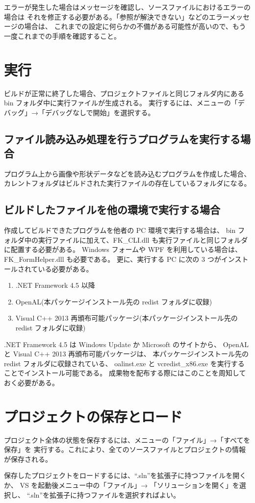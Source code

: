 \documentclass[a4j]{jarticle}
\begin{document}
エラーが発生した場合はメッセージを確認し、ソースファイルにおけるエラーの場合は
それを修正する必要がある。「参照が解決できない」などのエラーメッセージの場合は、
これまでの設定に何らかの不備がある可能性が高いので、もう一度これまでの手順を確認すること。


\section{実行}
ビルドが正常に終了した場合、プロジェクトファイルと同じフォルダ内にある 
bin フォルダ中に実行ファイルが生成される。
実行するには、メニューの「デバッグ」→「デバッグなしで開始」を選択する。

\subsection{ファイル読み込み処理を行うプログラムを実行する場合}
プログラム上から画像や形状データなどを読み込むプログラムを作成した場合、
カレントフォルダはビルドされた実行ファイルの存在しているフォルダになる。

\subsection{ビルドしたファイルを他の環境で実行する場合}
作成してビルドできたプログラムを他者の PC 環境で実行する場合は、
bin フォルダ中の実行ファイルに加えて、FK\_CLI.dll も実行ファイルと同じフォルダに配置する必要がある。
Windows フォームや WPF を利用している場合は、FK\_FormHelper.dll も必要である。
更に、実行する PC に次の 3 つがインストールされている必要がある。

\begin{enumerate}
\item .NET Framework 4.5 以降
\item OpenAL(本パッケージインストール先の redist フォルダに収録)
\item Visual C++ 2013 再頒布可能パッケージ(本パッケージインストール先の redist フォルダに収録)
\end{enumerate}

.NET Framework 4.5 は Windows Update か Microsoft のサイトから、
OpenAL と Visual C++ 2013 再頒布可能パッケージは、
本パッケージインストール先の redist フォルダに収録されている、
oalinst.exe と vcredist\_x86.exe を実行することでインストール可能である。
成果物を配布する際にはこのことを周知しておく必要がある。

\section{プロジェクトの保存とロード}
プロジェクト全体の状態を保存するには、メニューの「ファイル」→「すべてを保存」を
実行する。これにより、全てのソースファイルとプロジェクトの情報が保存される。

保存したプロジェクトをロードするには、``.sln''を拡張子に持つファイルを開くか、
VS を起動後メニュー中の「ファイル」→ 「ソリューションを開く」を選択し、
``.sln''を拡張子に持つファイルを選択すればよい。
\end{document}
